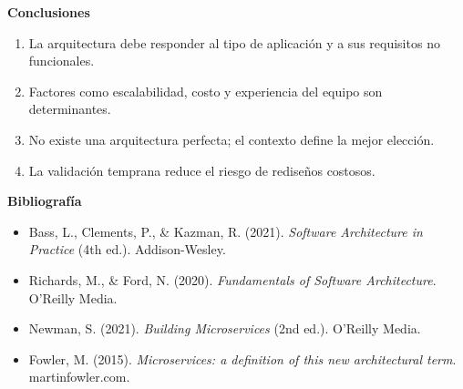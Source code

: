 \documentclass[12pt,letterpaper]{article}
\begin{document}
\textbf{Conclusiones}
\begin{enumerate}
    \item La arquitectura debe responder al tipo de aplicación y a sus requisitos no funcionales.
    \item Factores como escalabilidad, costo y experiencia del equipo son determinantes.
    \item No existe una arquitectura perfecta; el contexto define la mejor elección.
    \item La validación temprana reduce el riesgo de rediseños costosos.
\end{enumerate}

\textbf{Bibliografía}
\begin{itemize}
    \item Bass, L., Clements, P., \& Kazman, R. (2021). \textit{Software Architecture in Practice} (4th ed.). Addison-Wesley.
    \item Richards, M., \& Ford, N. (2020). \textit{Fundamentals of Software Architecture}. O’Reilly Media.
    \item Newman, S. (2021). \textit{Building Microservices} (2nd ed.). O’Reilly Media.
    \item Fowler, M. (2015). \textit{Microservices: a definition of this new architectural term}. martinfowler.com.
\end{itemize}
\end{document}
